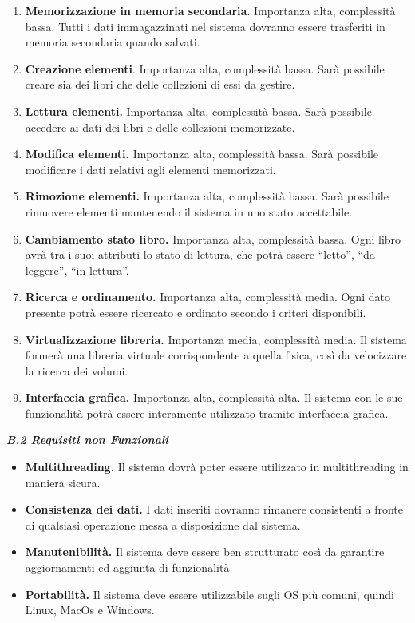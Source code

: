 \begin{enumerate}
\def\labelenumi{\arabic{enumi}.}
\item
  \textbf{Memorizzazione in memoria secondaria}. Importanza alta,
  complessità bassa. Tutti i dati immagazzinati nel sistema dovranno
  essere trasferiti in memoria secondaria quando salvati.
\item
  \textbf{Creazione elementi}. Importanza alta, complessità bassa. Sarà
  possibile creare sia dei libri che delle collezioni di essi da
  gestire.
\item
  \textbf{Lettura elementi.} Importanza alta, complessità bassa. Sarà
  possibile accedere ai dati dei libri e delle collezioni memorizzate.
\item
  \textbf{Modifica elementi.} Importanza alta, complessità bassa. Sarà
  possibile modificare i dati relativi agli elementi memorizzati.
\item
  \textbf{Rimozione elementi.} Importanza alta, complessità bassa. Sarà
  possibile rimuovere elementi mantenendo il sistema in uno stato
  accettabile.
\item
  \textbf{Cambiamento stato libro.} Importanza alta, complessità bassa.
  Ogni libro avrà tra i suoi attributi lo stato di lettura, che potrà
  essere ``letto'', ``da leggere'', ``in lettura''.
\item
  \textbf{Ricerca e ordinamento.} Importanza alta, complessità media.
  Ogni dato presente potrà essere ricercato e ordinato secondo i criteri
  disponibili.
\item
  \textbf{Virtualizzazione libreria.} Importanza media, complessità
  media. Il sistema formerà una libreria virtuale corrispondente a
  quella fisica, così da velocizzare la ricerca dei volumi.
\item
  \textbf{Interfaccia grafica.} Importanza alta, complessità alta. Il
  sistema con le sue funzionalità potrà essere interamente utilizzato
  tramite interfaccia grafica.
\end{enumerate}

\emph{\textbf{B.2 Requisiti non Funzionali}}

\begin{itemize}
\item
  \textbf{Multithreading.} Il sistema dovrà poter essere utilizzato in
  multithreading in maniera sicura.
\item
  \textbf{Consistenza dei dati.} I dati inseriti dovranno rimanere
  consistenti a fronte di qualsiasi operazione messa a disposizione dal
  sistema.
\item
  \textbf{Manutenibilità.} Il sistema deve essere ben strutturato così
  da garantire aggiornamenti ed aggiunta di funzionalità.
\item
  \textbf{Portabilità.} Il sistema deve essere utilizzabile sugli OS più
  comuni, quindi Linux, MacOs e Windows.
\end{itemize}

